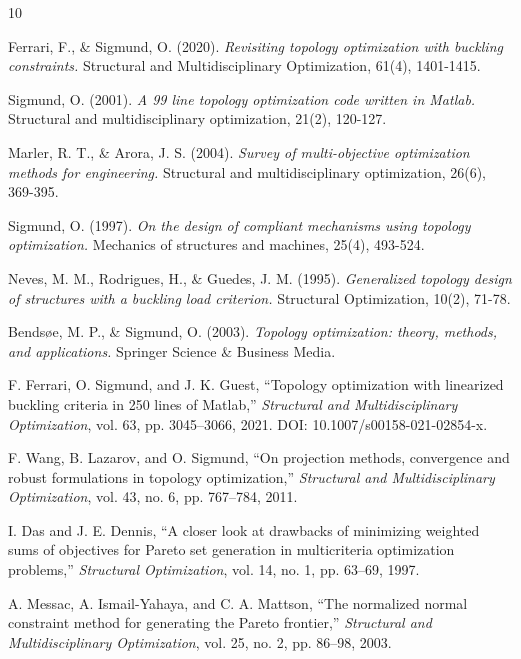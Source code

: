 \documentclass{article}
\begin{document}
\begin{thebibliography}{10}

 Ferrari, F., \& Sigmund, O. (2020). \textit{Revisiting topology optimization with buckling constraints.} Structural and Multidisciplinary Optimization, 61(4), 1401-1415.

 Sigmund, O. (2001). \textit{A 99 line topology optimization code written in Matlab.} Structural and multidisciplinary optimization, 21(2), 120-127.

 Marler, R. T., \& Arora, J. S. (2004). \textit{Survey of multi-objective optimization methods for engineering.} Structural and multidisciplinary optimization, 26(6), 369-395.

 Sigmund, O. (1997). \textit{On the design of compliant mechanisms using topology optimization.} Mechanics of structures and machines, 25(4), 493-524.

 Neves, M. M., Rodrigues, H., \& Guedes, J. M. (1995). \textit{Generalized topology design of structures with a buckling load criterion.} Structural Optimization, 10(2), 71-78.

 Bends\o e, M. P., \& Sigmund, O. (2003). \textit{Topology optimization: theory, methods, and applications.} Springer Science \& Business Media.

 F. Ferrari, O. Sigmund, and J. K. Guest, ``Topology optimization with linearized buckling criteria in 250 lines of Matlab,'' \textit{Structural and Multidisciplinary Optimization}, vol. 63, pp. 3045--3066, 2021. DOI: 10.1007/s00158-021-02854-x.

 F. Wang, B. Lazarov, and O. Sigmund, ``On projection methods, convergence and robust formulations in topology optimization,'' \textit{Structural and Multidisciplinary Optimization}, vol. 43, no. 6, pp. 767--784, 2011.

 I. Das and J. E. Dennis, ``A closer look at drawbacks of minimizing weighted sums of objectives for Pareto set generation in multicriteria optimization problems,'' \textit{Structural Optimization}, vol. 14, no. 1, pp. 63--69, 1997.

 A. Messac, A. Ismail-Yahaya, and C. A. Mattson, ``The normalized normal constraint method for generating the Pareto frontier,'' \textit{Structural and Multidisciplinary Optimization}, vol. 25, no. 2, pp. 86--98, 2003.

\end{thebibliography}
\end{document}
